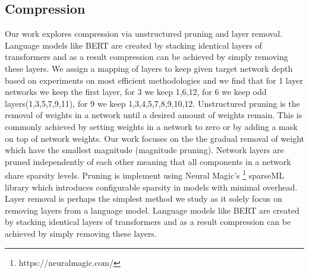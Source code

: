 \subsection{Compression}
Our work explores compression via unstructured pruning and layer removal. Language models like BERT are created by stacking identical layers of transformers and as a result compression can be achieved by simply removing these layers. We assign a mapping of layers to keep given target network depth based on experiments on most efficient methodologies and we find that for 1 layer networks we keep the first layer, for 3 we keep 1,6,12, for 6 we keep odd layers(1,3,5,7,9,11), for 9 we keep 1,3,4,5,7,8,9,10,12.
Unstructured pruning is the removal of weights in a network until a desired amount of weights remain. This is commonly achieved by setting weights in a network to zero or by adding a mask on top of network weights. Our work focuses on the the gradual removal of weight which have the smallest magnitude (magnitude pruning). Network layers are pruned independently of each other meaning that all components in a network share sparsity levels. Pruning is implement using Neural Magic's \footnote{https://neuralmagic.com/} sparseML library which introduces configurable sparsity in models with minimal overhead. \\
Layer removal is perhaps the simplest method we study as it solely focus on removing layers from a language model. Language models like BERT are created by stacking identical layers of transformers and as a result compression can be achieved by simply removing these layers. 